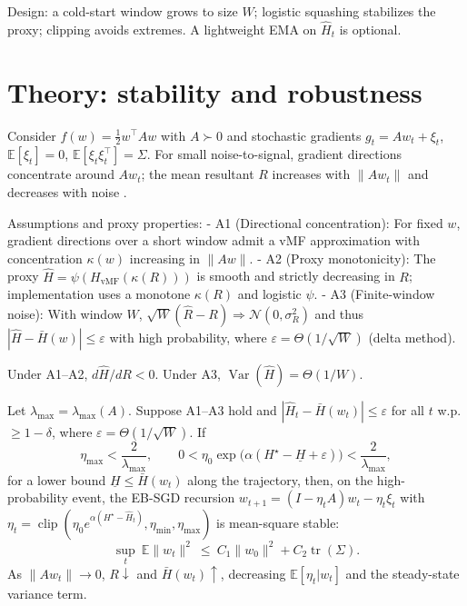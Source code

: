Design: a cold-start window grows to size $W$; logistic squashing stabilizes the proxy; clipping avoids extremes. A lightweight EMA on $\widehat{H}_t$ is optional.

\section{Theory: stability and robustness}
Consider $f(w)=\tfrac12 w^\top A w$ with $A\succ0$ and stochastic gradients $g_t=Aw_t+\xi_t$, $\mathbb{E}[\xi_t]=0$, $\mathbb{E}[\xi_t\xi_t^\top]=\Sigma$. For small noise-to-signal, gradient directions concentrate around $Aw_t$; the mean resultant $R$ increases with $\|Aw_t\|$ and decreases with noise \cite{MardiaJupp2000Directional}.

Assumptions and proxy properties:
- A1 (Directional concentration): For fixed $w$, gradient directions over a short window admit a vMF approximation with concentration $\kappa(w)$ increasing in $\|Aw\|$.
- A2 (Proxy monotonicity): The proxy $\widehat{H}=\psi(H_{\text{vMF}}(\kappa(R)))$ is smooth and strictly decreasing in $R$; implementation uses a monotone $\kappa(R)$ and logistic $\psi$.
- A3 (Finite-window noise): With window $W$, $\sqrt{W}(\hat{R}-R)\Rightarrow\mathcal{N}(0,\sigma_R^2)$ and thus $|\widehat{H}-\bar{H}(w)|\le \varepsilon$ with high probability, where $\varepsilon=\Theta(1/\sqrt{W})$ (delta method).

\begin{lemma}
Under A1--A2, $d\widehat{H}/dR<0$. Under A3, $\operatorname{Var}(\widehat{H})=\Theta(1/W)$.
\end{lemma}

\begin{theorem}
Let $\lambda_{\max}=\lambda_{\max}(A)$. Suppose A1--A3 hold and $|\widehat{H}_t-\bar{H}(w_t)|\le \varepsilon$ for all $t$ w.p. $\ge 1-\delta$, where $\varepsilon=\Theta(1/\sqrt{W})$. If
\[
\eta_{\max} < \frac{2}{\lambda_{\max}},\qquad
0< \eta_0 \exp\!\big(\alpha(H^\star - \underline{H} + \varepsilon)\big) < \frac{2}{\lambda_{\max}},
\]
for a lower bound $\underline{H}\le \bar{H}(w_t)$ along the trajectory, then, on the high-probability event, the EB-SGD recursion
$
w_{t+1}=(I-\eta_t A)w_t - \eta_t \xi_t
$
with $\eta_t=\operatorname{clip}\left(\eta_0 e^{\alpha(H^\star-\widehat{H}_t)},\eta_{\min},\eta_{\max}\right)$ is mean-square stable:
\[
\sup_t \ \mathbb{E}\|w_t\|^2 \ \le\ C_1 \|w_0\|^2 + C_2 \operatorname{tr}(\Sigma).
\]
As $\|Aw_t\|\to 0$, $R\downarrow$ and $\bar{H}(w_t)\uparrow$, decreasing $\mathbb{E}[\eta_t|w_t]$ and the steady-state variance term.
\end{theorem}

